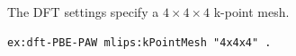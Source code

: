 The DFT settings specify a $4\times4\times4$ k-point mesh.
\begin{lstlisting}[language=turtle]
ex:dft-PBE-PAW mlips:kPointMesh "4x4x4" .
\end{lstlisting}
